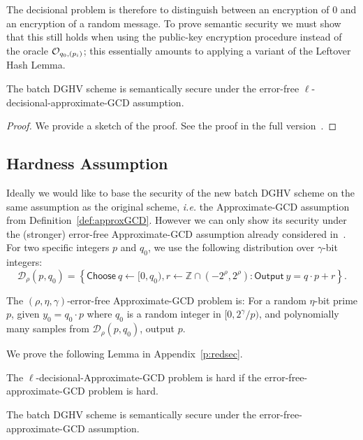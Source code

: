 \documentclass[11pt]{llncs}
\newcommand{\ie}{\textsl{i.e.}\xspace}
\newcommand{\Z}{{\mathbb Z}}
\newcommand*\Choose{\ensuremath{\mathsf{Choose}\ }}
\newcommand*\Output{\ensuremath{\mathsf{Output}\ }}
\begin{document}
The decisional
problem is therefore to distinguish between an encryption of $0$ and
an encryption of a random message. To prove semantic security 
we must show that this  still holds when using the public-key
encryption procedure instead of the oracle ${\cal 
    O}_{q_0,(p_i)}$; this essentially amounts to applying a variant
                    of the Leftover Hash Lemma.

\begin{theorem}\label{thm:l-dAGC}
The batch DGHV scheme is semantically secure under the
error-free $\ell$-decisional-approximate-GCD assumption.
\end{theorem}

\begin{proof}
We provide a sketch of the proof. See the proof in the full version~\cite{CLT2013a}.
\end{proof}


\subsection{Hardness Assumption}

Ideally we would like to base the security of the new batch DGHV scheme on
the same assumption as the original scheme, \ie the
Approximate-GCD assumption from Definition~\ref{def:approxGCD}.
However we can only show its security under the
(stronger) error-free Approximate-GCD assumption already considered in~\cite{CMNT2011,CNT2012}.
 For two specific
integers $p$ and $q_0$, we use the following distribution over
$\gamma$-bit integers:  
\[ \mathcal D_\rho(p,q_0) = \left\{ \Choose q\leftarrow [0, q_0),
  r\leftarrow \Z\cap (-2^\rho, 2^\rho) : \Output y=q\cdot p+r
  \right\}. \] 

\begin{definition} 
The $(\rho, \eta,{\gamma})$-error-free Appro\-xi\-ma\-te-GCD pro\-blem
is: For a random $\eta$-bit prime $p$, given $y_0=q_0\cdot p$
where $q_0$ is a random integer in $[0,
  2^{\gamma}/p)$, and polynomially many samples from $\mathcal
  D_\rho(p,q_0)$, output $p$. 
\end{definition} 
We prove the following Lemma in Appendix~\ref{p:redsec}.

\begin{lemma}
\label{l:redsec}
The $\ell$-decisional-Approximate-GCD problem is hard if the
error-free-approximate-GCD problem is hard.
\end{lemma}

\begin{corollary}
The batch DGHV scheme is semantically secure under the
error-free-approximate-GCD assumption.
\end{corollary}
\end{document}
